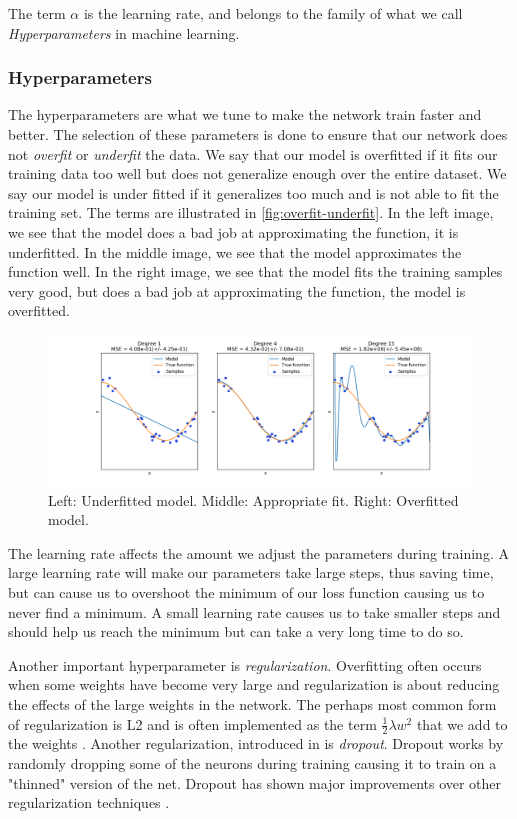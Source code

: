 The term $\alpha$ is the learning rate, and belongs to the family of what we call \emph{Hyperparameters} in machine learning.

\subsubsection*{Hyperparameters}
The hyperparameters are what we tune to make the network train faster and better. The selection of these parameters is done to ensure that our network does not \emph{overfit} or \emph{underfit} the data. We say that our model is overfitted if it fits our training data too well but does not generalize enough over the entire dataset. We say our model is under fitted if it generalizes too much and is not able to fit the training set. The terms are illustrated in \autoref{fig:overfit-underfit}. In the left image, we see that the model does a bad job at approximating the function, it is underfitted. In the middle image, we see that the model approximates the function well. In the right image, we see that the model fits the training samples very good, but does a bad job at approximating the function, the model is overfitted.

\begin{figure}[H]
    \centering
    \includegraphics[width=\linewidth]{fig/overfit-underfit.png}
    \caption{Left: Underfitted model. Middle: Appropriate fit. Right: Overfitted model. }
    \label{fig:overfit-underfit}
\end{figure}
The learning rate affects the amount we adjust the parameters during training. A large learning rate will make our parameters take large steps, thus saving time, but can cause us to overshoot the minimum of our loss function causing us to never find a minimum. A small learning rate causes us to take smaller steps and should help us reach the minimum but can take a very long time to do so.

Another important hyperparameter is \emph{regularization}. Overfitting often occurs when some weights have become very large and regularization is about reducing the effects of the large weights in the network. The perhaps most common form of regularization is L2 and is often implemented as the term $\frac{1}{2}\lambda w^2$ that we add to the weights \cite{Li}. Another regularization, introduced in \citet{Srivastava2014} is \emph{dropout}. Dropout works by randomly dropping some of the neurons during training causing it to train on a "thinned" version of the net. Dropout has shown major improvements over other regularization techniques \cite{Srivastava2014}.

